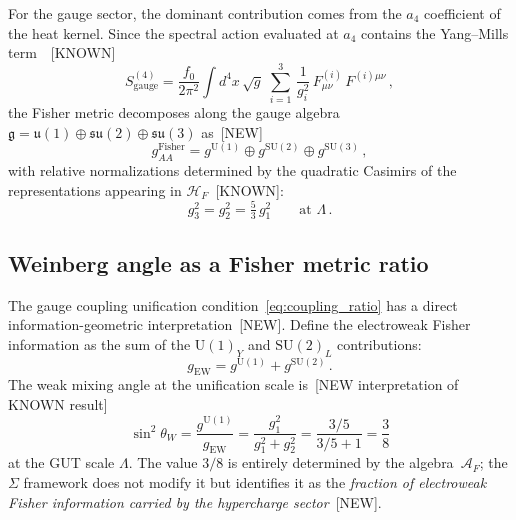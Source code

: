 For the gauge sector,
the dominant contribution comes from the
$a_4$ coefficient of the heat kernel.
Since the spectral action evaluated at $a_4$
contains the Yang--Mills
term~\cite{CC1996,vS2024}~[KNOWN]
\begin{equation}\label{eq:a4_gauge}
  S^{(4)}_{\mathrm{gauge}}
  = \frac{f_0}{2\pi^2}
    \int\! d^4x\,\sqrt{g}\;
    \sum_{i=1}^{3}\,
    \frac{1}{g_i^2}\,
    F_{\mu\nu}^{(i)}\, F^{(i)\mu\nu}\,,
\end{equation}
the Fisher metric decomposes along the
gauge algebra $\mathfrak{g}
= \mathfrak{u}(1) \oplus \mathfrak{su}(2)
\oplus \mathfrak{su}(3)$
as~[NEW]
\begin{equation}\label{eq:gAA_decomp}
  g_{AA}^{\mathrm{Fisher}}
  = g^{\mathrm{U}(1)}
  \oplus g^{\mathrm{SU}(2)}
  \oplus g^{\mathrm{SU}(3)}\,,
\end{equation}
with relative normalizations determined by
the quadratic Casimirs of the representations
appearing in $\mathcal{H}_F$~[KNOWN]:
\begin{equation}\label{eq:coupling_ratio}
  g_3^2 = g_2^2
  = \tfrac{5}{3}\, g_1^2
  \qquad\text{at } \Lambda\,.
\end{equation}


\subsection{Weinberg angle as a Fisher metric ratio}
\label{sec:Weinberg}

The gauge coupling unification
condition~\eqref{eq:coupling_ratio}
has a direct information-geometric
interpretation~[NEW].
Define the electroweak Fisher information
as the sum of the $\mathrm{U}(1)_Y$
and $\mathrm{SU}(2)_L$ contributions:
\begin{equation}\label{eq:g_EW}
  g_{\mathrm{EW}}
  = g^{\mathrm{U}(1)} + g^{\mathrm{SU}(2)}\,.
\end{equation}
The weak mixing angle at the unification
scale is~[NEW interpretation of KNOWN result]
\begin{equation}\label{eq:sin2theta}
  \boxed{\;
  \sin^2\theta_W
  = \frac{g^{\mathrm{U}(1)}}{g_{\mathrm{EW}}}
  = \frac{g_1^2}{g_1^2 + g_2^2}
  = \frac{3/5}{3/5 + 1}
  = \frac{3}{8}
  \;}
\end{equation}
at the GUT scale $\Lambda$.
The value $3/8$ is entirely determined by
the algebra~$\mathcal{A}_F$;
the $\Sigma$ framework does not modify it
but identifies it as the \emph{fraction of
electroweak Fisher information carried by the
hypercharge sector}~[NEW].

